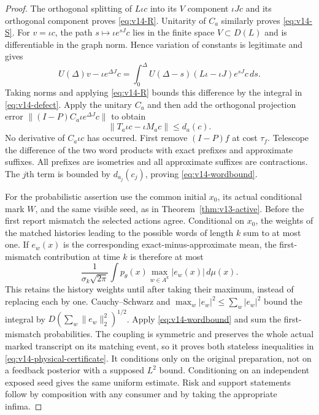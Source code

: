 \begin{proof}
The orthogonal splitting of $L\iota c$ into its $V$ component
$\iota Jc$ and its orthogonal component proves \eqref{eq:v14-R}.
Unitarity of $C_a$ similarly proves \eqref{eq:v14-S}.
For $v=\iota c$, the path $s\mapsto\iota e^{sJ}c$ lies in the finite
space $V\subset D(L)$ and is differentiable in the graph norm. Hence
variation of constants is legitimate and gives
\[
 U(\Delta)v-\iota e^{\Delta J}c
 =\int_0^\Delta U(\Delta-s)(L\iota-\iota J)e^{sJ}c\,ds.
\]
Taking norms and applying \eqref{eq:v14-R} bounds this difference by
the integral in \eqref{eq:v14-defect}. Apply the unitary $C_a$ and then
add the orthogonal projection error
$\|(I-P)C_a\iota e^{\Delta J}c\|$ to obtain
\[
 \|T_a\iota c-\iota M_ac\|\le d_a(c).
\]
No derivative of $C_a\iota c$ has occurred. First remove
$(I-P)f$ at cost $\tau_f$. Telescope the difference of the two word
products with exact prefixes and approximate suffixes. All prefixes
are isometries and all approximate suffixes are contractions. The
$j$th term is bounded by $d_{a_j}(c_j)$, proving
\eqref{eq:v14-wordbound}.

For the probabilistic assertion use the common initial $x_0$, its
actual conditional mark $W$, and the same visible seed, as in
Theorem~\ref{thm:v13-active}. Before the first report mismatch the
selected actions agree. Conditional on $x_0$, the weights of the
matched histories leading to the possible words of length $k$ sum to
at most one. If $e_w(x)$ is the corresponding exact-minus-approximate
mean, the first-mismatch contribution at time $k$ is therefore at most
\[
 \frac{1}{\sigma_k\sqrt{2\pi}}
        \int p_\theta(x)\max_{w\in A^k}|e_w(x)|\,d\mu(x).
\]
This retains the history weights until after taking their maximum,
instead of replacing each by one. Cauchy--Schwarz and
$\max_w|e_w|^2\le\sum_w|e_w|^2$ bound the integral by
$D(\sum_w\|e_w\|_2^2)^{1/2}$. Apply
\eqref{eq:v14-wordbound} and sum the first-mismatch probabilities.
The coupling is symmetric and preserves the whole actual marked
transcript on its matching event, so it proves both stateless
inequalities in \eqref{eq:v14-physical-certificate}. It conditions only
on the original preparation, not on a feedback posterior with a
supposed $L^2$ bound. Conditioning on an independent exposed seed gives
the same uniform estimate. Risk and support statements follow by
composition with any consumer and by taking the appropriate infima.
\end{proof}

